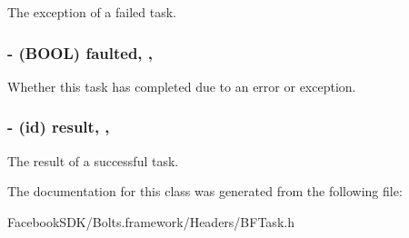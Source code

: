 The exception of a failed task. \hypertarget{interface_b_f_task_a8b36396022612bbb109bb26e097874be}{
\subsubsection[{faulted}]{\setlength{\rightskip}{0pt plus 5cm}-\/ (B\-O\-O\-L) faulted\hspace{0.3cm}{\ttfamily [read]}, {\ttfamily [nonatomic]}, {\ttfamily [assign]}}}\label{interface_b_f_task_a8b36396022612bbb109bb26e097874be}
Whether this task has completed due to an error or exception. \hypertarget{interface_b_f_task_a4b748e2af91631b135ca3e324a9fac2e}{
\subsubsection[{result}]{\setlength{\rightskip}{0pt plus 5cm}-\/ (id) result\hspace{0.3cm}{\ttfamily [read]}, {\ttfamily [nonatomic]}, {\ttfamily [strong]}}}\label{interface_b_f_task_a4b748e2af91631b135ca3e324a9fac2e}
The result of a successful task. 

The documentation for this class was generated from the following file\-:\begin{DoxyCompactItemize}
\item 
Facebook\-S\-D\-K/\-Bolts.\-framework/\-Headers/B\-F\-Task.\-h\end{DoxyCompactItemize}
